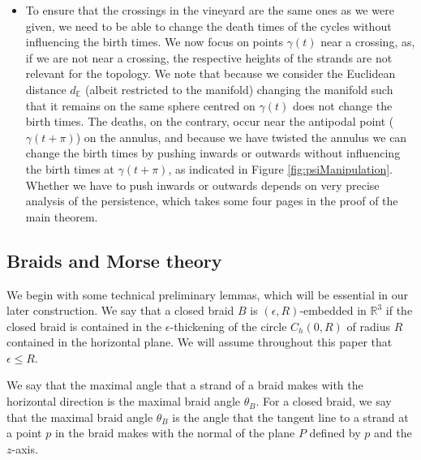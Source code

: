 \documentclass[twoside,leqno]{article}
\begin{document}
\begin{itemize}
\begin{figure}[h!]
{    }
    \label{fig:NoWiggle}
\end{figure}
\item To ensure that the crossings in the vineyard are the same ones as we were given, 
%
we need to be able to change the death times of the cycles without influencing the birth times. We now focus on points $\gamma(t)$ near a crossing, as, if we are not near a crossing, the respective heights of the strands are not relevant for the topology. We note that because we consider the Euclidean distance $d_{\mathbb{E}}$ (albeit restricted to the manifold) changing the manifold such that it remains on the same sphere centred on $\gamma(t)$ does not change the birth times. The deaths, on the contrary, occur near the antipodal point ($\gamma(t+\pi)$) on the annulus, and because we have twisted the annulus we can change the birth times by pushing inwards or outwards without influencing the birth times at $\gamma(t+\pi)$, as indicated in Figure \ref{fig:psiManipulation}. Whether we have to push inwards or outwards depends on very precise analysis of the persistence, which takes some four pages in the proof of the main theorem. 
\end{itemize}


\subsection{Braids and Morse theory} \label{sec:BraidsAndMorse}

We begin with some technical preliminary lemmas, which will be essential in our later construction.
We say that a closed braid $B$ is $(\epsilon,R)$-embedded in $\mathbb{R}^3$ if the closed braid is contained in the $\epsilon$-thickening of the circle $C_h(0,R)$ of radius $R$ contained in the horizontal plane. We will  assume throughout this paper that $\epsilon \leq R$. 

We say that the maximal angle that a strand of a braid makes with the horizontal direction is the maximal braid angle $\theta_B$. For a closed braid, we say that the maximal braid angle $\theta_B$ is the angle that the tangent line to a strand at a point $p$ in the braid makes with the normal of the plane $P$ defined by $p$ and the $z$-axis.
\end{document}
